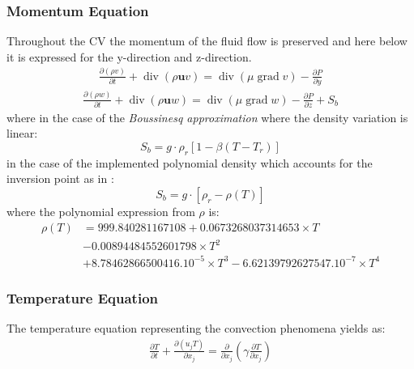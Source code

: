 \subsubsection{Momentum Equation}
Throughout the CV the momentum of the fluid flow is preserved and here below it is expressed for the y-direction and z-direction.
\begin{equation}
	\begin{aligned}
		\frac{\partial(\rho v)}{\partial t}+\operatorname{div}(\rho \mathbf{u} v)=\operatorname{div}(\mu \operatorname{grad} v)-\frac{\partial P}{\partial y}
	\end{aligned}
	\label{}
\end{equation}
\begin{equation}
	\begin{aligned}
		\frac{\partial(\rho w)}{\partial t}+\operatorname{div}(\rho \mathbf{u} w)=\operatorname{div}(\mu \operatorname{grad} w)-\frac{\partial P}{\partial z}+S_{b}
	\end{aligned}
	\label{}
\end{equation}
where in the case of the \textit{Boussinesq approximation} where the density variation is linear:
\begin{equation}
	S_{b} = g\cdot\rho_{r}[1-\beta(T-T_{r})]
\end{equation}
in the case of the implemented polynomial density which accounts for the inversion point as in \cite{bourdillon_2016}:
\begin{equation}
S_{b} = g\cdot[\rho_{r}-\rho(T)]
\end{equation}
where the polynomial expression from $\rho$ is:
\begin{equation}
	\begin{aligned}
		\rho(T) &=999.840281167108+0.0673268037314653 \times T \\
		&-0.00894484552601798 \times T^{2} \\
		&+8.78462866500416 .10^{-5} \times T^{3} 
		-6.62139792627547 .10^{-7} \times T^{4}
	\end{aligned}
\end{equation}


\subsubsection{Temperature Equation}
The temperature equation representing the convection phenomena yields as:
\begin{equation}
	\begin{aligned}
	\frac{\partial T}{\partial t}+ \frac{\partial (u_{j} T)}{\partial x_{j}}=\frac{\partial}{\partial x_{j}}\left(\gamma \frac{\partial T}{\partial x_{j}}\right)
	\end{aligned}
\end{equation}

